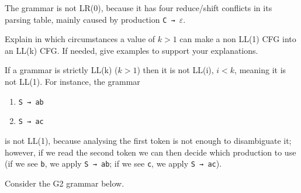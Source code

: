 \documentclass[docid=2019]{comp_exam_round2}
\begin{document}
The grammar is not LR(0), because it has four reduce/shift conflicts in its parsing table, mainly caused by production \texttt{C → $\varepsilon$}.

\question
Explain in which circumstances a value of $k > 1$ can make a non LL(1) CFG into an LL(k) CFG.
If needed, give examples to support your explanations.

\ansseparator

If a grammar is strictly LL(k) ($k>1$) then it is not LL(i), $i < k$, meaning it is not LL(1). For instance, the grammar

\begin{enumerate}
    \item \texttt{S → ab}
    \item \texttt{S → ac}
\end{enumerate}

\noindent
is not LL(1), because analysing the first token is not enough to disambiguate it; however, if we read the second token we can then decide which production to use (if we see \texttt{b}, we apply \texttt{S → ab}; if we see \texttt{c}, we apply \texttt{S → ac}).

\examgroup{}

Consider the G2 grammar below.

~
\end{document}
